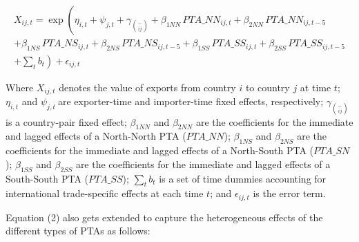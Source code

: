 \documentclass[12pt]{article}%
\begin{document}
\begin{multline}
    X_{ij,t} = \exp\left(\eta_{i,t} + \psi_{j,t} + \gamma_{\binom{-}{ij}} + \beta_{1NN} \, PTA\_NN_{ij,t} + \beta_{2NN} \, PTA\_NN_{ij,t-5} \right. \\
    + \beta_{1NS} \, PTA\_NS_{ij,t} + \beta_{2NS} \, PTA\_NS_{ij,t-5} + \beta_{1SS} \, PTA\_SS_{ij,t} + \beta_{2SS} \, PTA\_SS_{ij,t-5} \\
    + \left. \sum_{t} b_{t} \right) + \epsilon_{ij,t}
\end{multline}

Where \(X_{ij,t}\)\hspace{0pt} denotes the value of exports from country
\(i\) to country \(j\) at time \(t\); \(\eta_{i,t}\) and
\(\psi_{j,t}\ \)are exporter-time and importer-time fixed effects,
respectively; \(\gamma_{\binom{-}{ij}}\) is a country-pair fixed effect;
\hspace{0pt}\(\beta_{1NN}\) and \(\beta_{2NN}\) are the coefficients for
the immediate and lagged effects of a North-North PTA (\(PTA\_ NN\));
\hspace{0pt}\hspace{0pt}\(\beta_{1NS}\) and \(\beta_{2NS}\) are the
coefficients for the immediate and lagged effects of a North-South PTA
(\(PTA\_ SN\)); \hspace{0pt}\hspace{0pt}\(\beta_{1SS}\) and
\(\beta_{2SS}\) are the coefficients for the immediate and lagged
effects of a South-South PTA (\(PTA\_ SS\)); \(\sum_{t}^{}b_{t}\) is a
set of time dummies accounting for international trade-specific effects
at each time \(t\); and \(\epsilon_{ij,t}\) is the error term.

Equation (2) also gets extended to capture the heterogeneous effects of
the different types of PTAs as follows:

\end{document}
